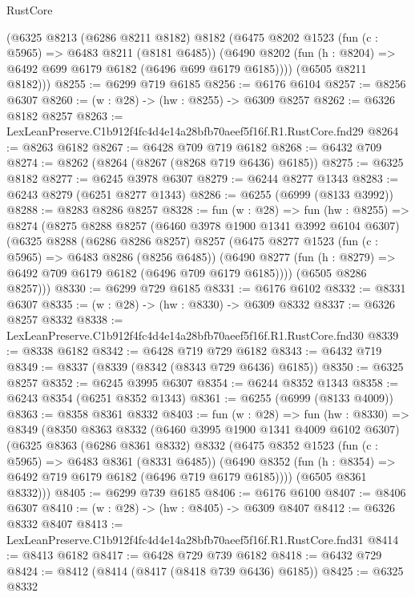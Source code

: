 \begin{lexlean}{RustCore}
\begin{coremodule}
      (@6325
        @8213
        (@6286 @8211 @8182)
        @8182
        (@6475
          @8202
          @1523
          (fun (c : @5965) => @6483 @8211 (@8181 @6485))
          (@6490 @8202 (fun (h : @8204) => @6492 @699 @6179 @6182 (@6496 @699 @6179 @6185))))
        (@6505 @8211 @8182)))
@8255 := @6299 @719 @6185
@8256 := @6176 @6104
@8257 := @8256 @6307
@8260 := (w : @28) -> (hw : @8255) -> @6309 @8257
@8262 := @6326 @8182 @8257
@8263 := LexLeanPreserve.C1b912f4fc4d4e14a28bfb70aeef5f16f.R1.RustCore.fnd29
@8264 := @8263 @6182
@8267 := @6428 @709 @719 @6182
@8268 := @6432 @709
@8274 := @8262 (@8264 (@8267 (@8268 @719 @6436) @6185))
@8275 := @6325 @8182
@8277 := @6245 @3978 @6307
@8279 := @6244 @8277 @1343
@8283 := @6243 @8279 (@6251 @8277 @1343)
@8286 := @6255 (@6999 (@8133 @3992))
@8288 := @8283 @8286 @8257
@8328 := fun (w : @28) =>
  fun (hw : @8255) =>
  @8274
    (@8275
      @8288
      @8257
      (@6460 @3978 @1900 @1341 @3992 @6104 @6307)
      (@6325
        @8288
        (@6286 @8286 @8257)
        @8257
        (@6475
          @8277
          @1523
          (fun (c : @5965) => @6483 @8286 (@8256 @6485))
          (@6490 @8277 (fun (h : @8279) => @6492 @709 @6179 @6182 (@6496 @709 @6179 @6185))))
        (@6505 @8286 @8257)))
@8330 := @6299 @729 @6185
@8331 := @6176 @6102
@8332 := @8331 @6307
@8335 := (w : @28) -> (hw : @8330) -> @6309 @8332
@8337 := @6326 @8257 @8332
@8338 := LexLeanPreserve.C1b912f4fc4d4e14a28bfb70aeef5f16f.R1.RustCore.fnd30
@8339 := @8338 @6182
@8342 := @6428 @719 @729 @6182
@8343 := @6432 @719
@8349 := @8337 (@8339 (@8342 (@8343 @729 @6436) @6185))
@8350 := @6325 @8257
@8352 := @6245 @3995 @6307
@8354 := @6244 @8352 @1343
@8358 := @6243 @8354 (@6251 @8352 @1343)
@8361 := @6255 (@6999 (@8133 @4009))
@8363 := @8358 @8361 @8332
@8403 := fun (w : @28) =>
  fun (hw : @8330) =>
  @8349
    (@8350
      @8363
      @8332
      (@6460 @3995 @1900 @1341 @4009 @6102 @6307)
      (@6325
        @8363
        (@6286 @8361 @8332)
        @8332
        (@6475
          @8352
          @1523
          (fun (c : @5965) => @6483 @8361 (@8331 @6485))
          (@6490 @8352 (fun (h : @8354) => @6492 @719 @6179 @6182 (@6496 @719 @6179 @6185))))
        (@6505 @8361 @8332)))
@8405 := @6299 @739 @6185
@8406 := @6176 @6100
@8407 := @8406 @6307
@8410 := (w : @28) -> (hw : @8405) -> @6309 @8407
@8412 := @6326 @8332 @8407
@8413 := LexLeanPreserve.C1b912f4fc4d4e14a28bfb70aeef5f16f.R1.RustCore.fnd31
@8414 := @8413 @6182
@8417 := @6428 @729 @739 @6182
@8418 := @6432 @729
@8424 := @8412 (@8414 (@8417 (@8418 @739 @6436) @6185))
@8425 := @6325 @8332

\end{coremodule}
\end{lexlean}
